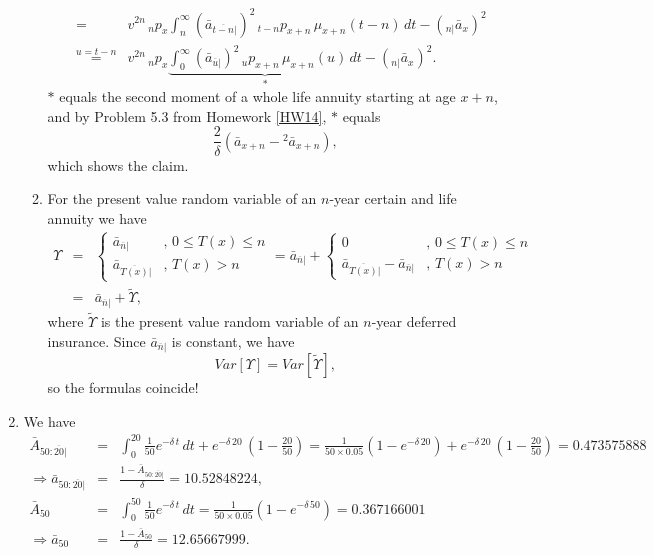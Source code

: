 \documentclass[11pt,fleqn,oneside]{book}
\begin{document}
\begin{enumerate}
\begin{enumerate}
\begin{eqnarray*}
&=& v^{2n} \,{_np_x} \int_n^{\infty}  \left({\bar{a}_{\overline{t-n}|}}\right)^2\,{_{t-n}p_{x+n}}\,\mu_{x+n}(t-n)\,dt - \left({_{n|}\bar{a}_{x}}\right)^2\\
&\stackrel{u=t-n}{=}& v^{2n} \,{_np_x} \underbrace{\int_0^{\infty}  \left({\bar{a}_{\overline{u}|}}\right)^2\,{_{u}p_{x+n}}\,\mu_{x+n}(u)\,dt}_{*} - \left({_{n|}\bar{a}_{x}}\right)^2.
\end{eqnarray*}
$*$ equals the second moment of a whole life annuity starting at age $x+n$, and by Problem 5.3 from Homework \ref{HW14}, $*$ equals 
$$
\frac{2}{\delta} \left({\bar{a}_{x+n}} - {^2\bar{a}_{x+n}}\right),
$$
 which shows the claim.
\item For the present value random variable of an $n$-year certain and life annuity we have
\begin{eqnarray*}
\Upsilon &=& \left\{\begin{array}{cl}
{\bar{a}_{\overline{n}|}}&,\,0\leq T(x) \leq n\\
{\bar{a}_{\overline{T(x)}|}} &,\,T(x)>n
\end{array}\right. = {\bar{a}_{\overline{n}|}} + \left\{\begin{array}{cl}
0&,\,0\leq T(x) \leq n\\
{\bar{a}_{\overline{T(x)}|}} - {\bar{a}_{\overline{n}|}} &,\,T(x)>n
\end{array}\right.\\
&=& {\bar{a}_{\overline{n}|}} + \tilde{\Upsilon},
\end{eqnarray*}
where $\tilde{\Upsilon}$ is the present value random variable of an $n$-year deferred insurance. Since ${\bar{a}_{\overline{n}|}}$ is constant, we have
$$
Var[\Upsilon] = Var[\tilde{\Upsilon}],
$$
so the formulas coincide!
\end{enumerate}
\item We have
\begin{eqnarray*}
\bar{A}_{50:\overline{20}|} &=& \int_0^{20} \frac{1}{50} e^{-\delta\,t}\,dt + e^{-\delta\,20}\,(1-\frac{20}{50}) = \frac{1}{50\times 0.05} (1-e^{-\delta\,20}) + e^{-\delta\,20}\,(1-\frac{20}{50}) = 0.473575888\\
\Rightarrow \bar{a}_{50:\overline{20}|} &=& \frac{1-\bar{A}_{50:\overline{20}|}}{\delta} = 10.52848224,\\
\bar{A}_{50} &=& \int_0^{50} \frac{1}{50} e^{-\delta\,t}\,dt  = \frac{1}{50\times 0.05} (1-e^{-\delta\,50}) = 0.367166001\\
\Rightarrow \bar{a}_{50} &=& \frac{1-\bar{A}_{50} }{\delta} = 12.65667999.
\end{eqnarray*}

\end{enumerate}
\end{document}
